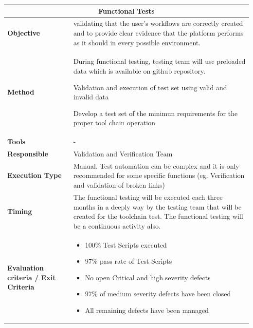 \begin{center}
\begin{longtable}[H]{|p{4cm}|p{9cm}|}\hline
\multicolumn{2}{|c|}{\textbf{Functional Tests}}\\\hline
\textbf{Objective} &  validating that the user’s workflows are correctly created and to provide clear evidence that the platform performs as it should in every possible environment.\\\hline
\textbf{Method} & During functional testing, testing team will use preloaded data which is available on github repository. 

Validation and execution of test set using valid and invalid data

Develop a test set of the minimun requirements for the proper tool chain operation\\\hline
\textbf{Tools} & -\\\hline
\textbf{Responsible} & Validation and Verification Team\\\hline
\textbf{Execution Type} & Manual. Test automation can be complex and it is only recommended for some specific functions (eg. Verification and validation of broken links)\\\hline
\textbf{Timing} & The functional testing will be executed each three months in a deeply way by the testing team that will be created for the toolchain test. The functional testing will be a continuous activity also. \\\hline
\textbf{Evaluation criteria / Exit Criteria} & \begin{itemize}
\item 100\% Test Scripts executed
\item 97\% pass rate of Test Scripts
\item No open Critical and high severity defects
\item 97\% of medium severity defects have been closed 
\item All remaining defects have been managed
\end{itemize} \\\hline
\end{longtable}
\end{center}

